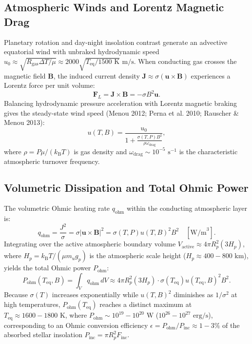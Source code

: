 \documentclass[11pt,a4paper]{article}
\begin{document}
\subsection{Atmospheric Winds and Lorentz Magnetic Drag}
Planetary rotation and day-night insolation contrast generate an advective equatorial wind with unbraked hydrodynamic speed $u_0 \approx \sqrt{R_{\mathrm{gas}} \Delta T / \mu} \approx 2000 \sqrt{T_{\mathrm{eq}} / 1500\text{ K}}\text{ m/s}$. When conducting gas crosses the magnetic field $\mathbf{B}$, the induced current density $\mathbf{J} \approx \sigma (\mathbf{u} \times \mathbf{B})$ experiences a Lorentz force per unit volume:
\begin{equation}
\mathbf{F}_L = \mathbf{J} \times \mathbf{B} = -\sigma B^2 \mathbf{u}.
\end{equation}
Balancing hydrodynamic pressure acceleration with Lorentz magnetic braking gives the steady-state wind speed (Menou 2012; Perna et al. 2010; Rauscher \& Menou 2013):
\begin{equation}
u(T, B) = \frac{u_0}{1 + \frac{\sigma(T, P) B^2}{\rho \omega_{\mathrm{drag}}}},
\label{eq:wind_drag}
\end{equation}
where $\rho = P \mu / (k_{\mathrm{B}} T)$ is gas density and $\omega_{\mathrm{drag}} \sim 10^{-5}\text{ s}^{-1}$ is the characteristic atmospheric turnover frequency.

\subsection{Volumetric Dissipation and Total Ohmic Power}
The volumetric Ohmic heating rate $q_{\mathrm{ohm}}$ within the conducting atmospheric layer is:
\begin{equation}
q_{\mathrm{ohm}} = \frac{J^2}{\sigma} = \sigma |\mathbf{u} \times \mathbf{B}|^2 = \sigma(T, P) u(T, B)^2 B^2 \quad [\text{W/m}^3].
\label{eq:volumetric_heating}
\end{equation}
Integrating over the active atmospheric boundary volume $V_{\mathrm{active}} \approx 4 \pi R_p^2 (3 H_p)$, where $H_p = k_{\mathrm{B}} T / (\mu m_u g_p)$ is the atmospheric scale height ($H_p \approx 400 - 800\text{ km}$), yields the total Ohmic power $P_{\mathrm{ohm}}$:
\begin{equation}
P_{\mathrm{ohm}}(T_{\mathrm{eq}}, B) = \int_{V} q_{\mathrm{ohm}}\,dV \approx 4 \pi R_p^2 (3 H_p) \cdot \sigma(T_{\mathrm{eq}}) u(T_{\mathrm{eq}}, B)^2 B^2.
\label{eq:p_ohmic}
\end{equation}
Because $\sigma(T)$ increases exponentially while $u(T, B)^2$ diminishes as $1/\sigma^2$ at high temperatures, $P_{\mathrm{ohm}}(T_{\mathrm{eq}})$ reaches a distinct maximum at $T_{\mathrm{eq}} \approx 1600 - 1800\text{ K}$, where $P_{\mathrm{ohm}} \sim 10^{19} - 10^{20}\text{ W}$ ($10^{26} - 10^{27}\text{ erg/s}$), corresponding to an Ohmic conversion efficiency $\epsilon = P_{\mathrm{ohm}} / P_{\mathrm{inc}} \approx 1 - 3\%$ of the absorbed stellar insolation $P_{\mathrm{inc}} = \pi R_p^2 F_{\mathrm{inc}}$.
\end{document}
